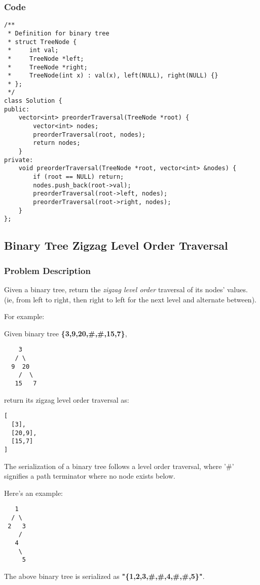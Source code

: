 \documentclass{article}
\begin{document}
\begin{CJK*}{UTF8}{gkai}
\subsubsection*{Code}
\begin{lstlisting}
/**
 * Definition for binary tree
 * struct TreeNode {
 *     int val;
 *     TreeNode *left;
 *     TreeNode *right;
 *     TreeNode(int x) : val(x), left(NULL), right(NULL) {}
 * };
 */
class Solution {
public:
    vector<int> preorderTraversal(TreeNode *root) {
        vector<int> nodes;
        preorderTraversal(root, nodes);
        return nodes;
    }
private:
    void preorderTraversal(TreeNode *root, vector<int> &nodes) {
        if (root == NULL) return;
        nodes.push_back(root->val);
        preorderTraversal(root->left, nodes);
        preorderTraversal(root->right, nodes);
    }
}; 
\end{lstlisting}


\subsection{ Binary Tree Zigzag Level Order Traversal }
\label{ Binary Tree Zigzag Level Order Traversal }

\subsubsection*{Problem Description}
Given a binary tree, return the \emph{zigzag level order} traversal of its nodes' values. (ie, from left to right, then right to left for the next level and alternate between).

For example:


Given binary tree \textbf{\{3,9,20,\#,\#,15,7\}},


\begin{verbatim}
    3
   / \
  9  20
    /  \
   15   7
\end{verbatim}

return its zigzag level order traversal as:


\begin{verbatim}
[
  [3],
  [20,9],
  [15,7]
]
\end{verbatim}

The serialization of a binary tree follows a level order traversal, where '\#' signifies a path terminator where no node exists below.

Here's an example:


\begin{verbatim}
   1
  / \
 2   3
    /
   4
    \
     5
\end{verbatim}
The above binary tree is serialized as \textbf{"\{1,2,3,\#,\#,4,\#,\#,5\}"}.



\end{CJK*}
\end{document}
